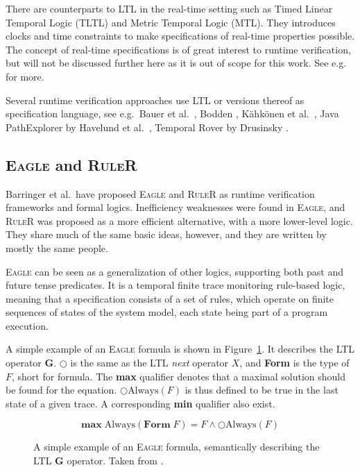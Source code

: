 There are counterparts to LTL in the real-time setting such as Timed Linear
Temporal Logic (TLTL) and Metric Temporal Logic (MTL). They introduces clocks
and time constraints to make specifications of real-time properties possible.
The concept of real-time specifications is of great interest to runtime
verification, but will not be discussed further here as it is out of scope for
this work. See e.g.\
\cite{bauer06monitoring,bauer07rvltl,drusinsky00temporalrover} for more.

Several runtime verification approaches use LTL or versions thereof as
specification language, see e.g.\ Bauer et al.\
\cite{bauer06monitoring}, Bodden \cite{bodden05efficientrv}, Kähkönen et al.\
\cite{kahkonen09lime}, Java PathExplorer by Havelund et al.\
\cite{havelund04jpax}, Temporal Rover by Drusinsky
\cite{drusinsky00temporalrover}.

\subsection{\textsc{Eagle} and \textsc{RuleR}}

Barringer et al.\ have proposed \textsc{Eagle} \cite{barringer03eagle} and
\textsc{RuleR} \cite{barringer07ruler} as runtime verification frameworks and
formal logics.  Inefficiency weaknesses were found in \textsc{Eagle}, and
\textsc{RuleR} was proposed as a more efficient alternative, with a more
lower-level logic. They share much of the same basic ideas, however, and they
are written by mostly the same people.

\textsc{Eagle} can be seen as a generalization of other logics, supporting both
past and future tense predicates. It is a temporal finite trace monitoring
rule-based logic, meaning that a specification consists of a set of rules,
which operate on finite sequences of states of the system model, each state
being part of a program execution.

A simple example of an \textsc{Eagle} formula is shown in
Figure~\ref{figure-eagle-always}.
It describes the LTL operator $\boldsymbol{G}$. $\bigcirc$ is the same as the
LTL \textit{next} operator $X$, and \textbf{Form} is the type of $F$, short for
formula. The \textbf{max} qualifier denotes that a maximal solution should be
found for the equation. $\bigcirc \text{Always}(F)$ is thus defined to be true
in the last state of a given trace. A corresponding \textbf{min} qualifier also
exist.

\begin{figure}[h!]
	\[
  \textbf{max} \; \text{Always}(\textbf{Form} \; F) = F \wedge \bigcirc \text{Always}(F)
	\]

  \caption{A simple example of an \textsc{Eagle} formula, semantically
    describing the LTL $\boldsymbol{G}$ operator. Taken from
    \cite{barringer03eagle}.}
	\label{figure-eagle-always}
\end{figure}

